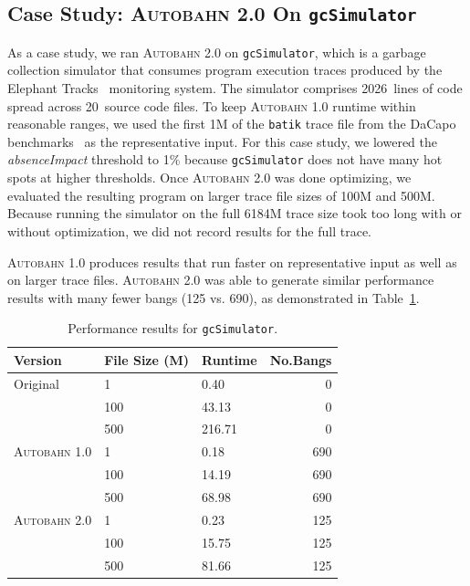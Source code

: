 \documentclass[format=sigplan, review=true, 9pt]{acmart}
\newcommand{\tblref}[1]{Table~\ref{#1}}
\newcommand{\hotspots}[0]{hot spots}
\newcommand{\Ao}[0]{\textsc{Autobahn 1.0}}
\newcommand{\At}[0]{\textsc{Autobahn 2.0}}
\newcommand{\absim}[0]{\textit{absenceImpact}}
\begin{document}
\subsection{Case Study: \At{} On \texttt{gcSimulator}}
As a case study, we ran \At{} on \texttt{gcSimulator}, which is a
garbage collection simulator that consumes program execution traces
produced by the Elephant Tracks~\cite{Ricci13} monitoring system.  The
simulator comprises 2026~lines of code spread across 20~source code
files.  To keep \Ao{} runtime within reasonable ranges, we used the
first 1M of the \texttt{batik} trace file from the DaCapo
benchmarks~\cite{Blackburn06} as the representative input.  For this
case study, we lowered the \absim{} threshold to 1\%
because \texttt{gcSimulator} does not have many \hotspots{} at higher
thresholds.  Once \At{} was done optimizing, we evaluated the
resulting program on larger trace file sizes of 100M and 500M. Because
running the simulator on the full 6184M trace size took too
long with or without optimization, we did not record results for the
full trace.

\Ao{} produces results that run
faster on representative input as well as on larger trace files.
\At{} was  able to generate similar performance results with many fewer
bangs (125 vs. 690), as demonstrated in \tblref{tab:gc}.

\begin{table}
\begin{tabular}{lllr}
\hline
Version   & File Size (M) & Runtime & No.Bangs \\
\hline
Original      & 1   &   0.40	 & 0   \\
          & 100        & 43.13      & 0 \\
       & 500     &  216.71 & 0 \\
\Ao{}       & 1     & 0.18    &  690\\
          & 100        & 14.19 &  690\\
                 & 500        & 68.98	& 690\\
\At{}      & 1   &  0.23 & 125    \\
          & 100        & 15.75 & 125      \\
       & 500    & 81.66 & 125    \\

\hline
\end{tabular}
\caption{Performance results for \texttt{gcSimulator}.}
\label{tab:gc}
\end{table}
\end{document}
